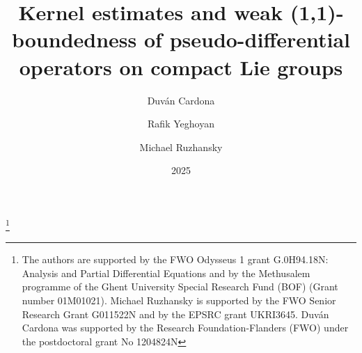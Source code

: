 \documentclass[12pt, reqno]{amsart}
\theoremstyle{definition}
\theoremstyle{remark}
\numberwithin{equation}{section}
\begin{document}
\setcounter{page}{1}

\title[Weak (1,1)-Boundedness of operators on compact Lie groups]{Kernel estimates and weak (1,1)-boundedness of pseudo-differential operators on compact Lie groups}

 \author[D. Cardona]{Duv\'an Cardona}
\address{
 Duv\'an Cardona:
  \endgraf
  Department of Mathematics: Analysis, Logic and Discrete Mathematics
  \endgraf
  Ghent University, Belgium
  \endgraf
  {\it E-mail address} {\rm duvan.cardonasanchez@ugent.be}
  }

  \author[R. Yeghoyan]{Rafik Yeghoyan}
\address{
 Rafik Yeghoyan:
  \endgraf
  Department of Mathematics: Analysis, Logic and Discrete Mathematics
  \endgraf
  Ghent University, Belgium
  \endgraf
  {\it E-mail address} {\rm rafik.yeghoyan@ugent.be}
  }

\author[M. Ruzhansky]{Michael Ruzhansky}
\address{
  Michael Ruzhansky:
  \endgraf
  Department of Mathematics: Analysis, Logic and Discrete Mathematics
  \endgraf
  Ghent University, Belgium
  \endgraf
 and
  \endgraf
  School of Mathematical Sciences
  \endgraf
  Queen Mary University of London
  \endgraf
  United Kingdom
  \endgraf
  {\it E-mail address} {\rm michael.ruzhansky@ugent.be}
  }

 

 \allowdisplaybreaks






\subjclass[2010]{}

\thanks{ The authors are supported  by the FWO  Odysseus  1  grant  G.0H94.18N:  Analysis  and  Partial Differential Equations and by the Methusalem programme of the Ghent University Special Research Fund (BOF)
(Grant number 01M01021). Michael Ruzhansky is supported by the FWO Senior Research Grant G011522N and by the EPSRC grant UKRI3645. Duv\'an Cardona was supported by the Research Foundation-Flanders
(FWO) under the postdoctoral grant No 1204824N}
\date{2025}
\end{document}
